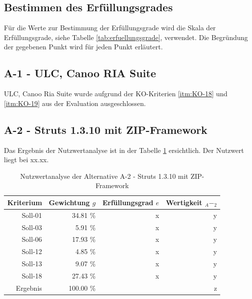   \subsection{Bestimmen des Erfüllungsgrades}
  
  Für die Werte zur Bestimmung der Erfüllungsgrade wird die Skala der
  Erfüllungsgrade, siehe Tabelle \ref{tab:erfuellungsgrade}, verwendet. Die
  Begründung der gegebenen Punkt wird für jeden Punkt erläutert.
  
  \subsection{A-1 - ULC, Canoo RIA Suite}
  
  ULC, Canoo Ria Suite wurde aufgrund der KO-Kriterien \ref{itm:KO-18} und
  \ref{itm:KO-19} aus der Evaluation ausgeschlossen.
  
  \subsection{A-2 - Struts 1.3.10 mit ZIP-Framework}
  
  Das Ergebnis der Nutzwertanalyse ist in der Tabelle \ref{tab:nwaA2}
  ersichtlich. Der Nutzwert liegt bei xx.xx.
  
  \begin{table}[ht]
    \sffamily 
    \begin{center}
      \begin{tabular}{r|rrr}
        \toprule
        \textbf{Kriterium} & \textbf{Gewichtung \(g\)} & \textbf{Erfüllungsgrad
        \(e\)} & \textbf{Wertigkeit \(_A-_2\)} \\
        \midrule
        Soll-01   & 34.81 \% & x & y \\
        Soll-03   &  5.91 \% & x & y \\
        Soll-06   & 17.93 \% & x & y \\
        Soll-12   &  4.85 \% & x & y \\
        Soll-13   &  9.07 \% & x & y \\
        Soll-18   & 27.43 \% & x & y \\
        \midrule
        \midrule
        Ergebnis  & 100.00 \% &   & z \\
        \bottomrule
      \end{tabular}
      \caption{Nutzwertanalyse der Alternative A-2 - Struts 1.3.10 mit
      ZIP-Framework}
      \label{tab:nwaA2}
    \end{center}
  \end{table}
    
